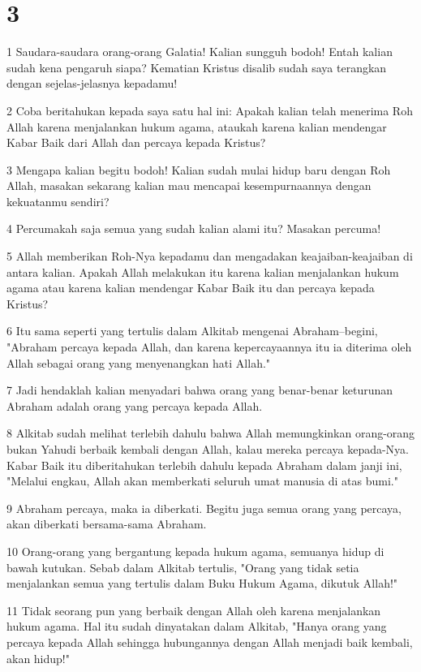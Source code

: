 \chapter{3}

\par 1 Saudara-saudara orang-orang Galatia! Kalian sungguh bodoh! Entah kalian sudah kena pengaruh siapa? Kematian Kristus disalib sudah saya terangkan dengan sejelas-jelasnya kepadamu!
\par 2 Coba beritahukan kepada saya satu hal ini: Apakah kalian telah menerima Roh Allah karena menjalankan hukum agama, ataukah karena kalian mendengar Kabar Baik dari Allah dan percaya kepada Kristus?
\par 3 Mengapa kalian begitu bodoh! Kalian sudah mulai hidup baru dengan Roh Allah, masakan sekarang kalian mau mencapai kesempurnaannya dengan kekuatanmu sendiri?
\par 4 Percumakah saja semua yang sudah kalian alami itu? Masakan percuma!
\par 5 Allah memberikan Roh-Nya kepadamu dan mengadakan keajaiban-keajaiban di antara kalian. Apakah Allah melakukan itu karena kalian menjalankan hukum agama atau karena kalian mendengar Kabar Baik itu dan percaya kepada Kristus?
\par 6 Itu sama seperti yang tertulis dalam Alkitab mengenai Abraham--begini, "Abraham percaya kepada Allah, dan karena kepercayaannya itu ia diterima oleh Allah sebagai orang yang menyenangkan hati Allah."
\par 7 Jadi hendaklah kalian menyadari bahwa orang yang benar-benar keturunan Abraham adalah orang yang percaya kepada Allah.
\par 8 Alkitab sudah melihat terlebih dahulu bahwa Allah memungkinkan orang-orang bukan Yahudi berbaik kembali dengan Allah, kalau mereka percaya kepada-Nya. Kabar Baik itu diberitahukan terlebih dahulu kepada Abraham dalam janji ini, "Melalui engkau, Allah akan memberkati seluruh umat manusia di atas bumi."
\par 9 Abraham percaya, maka ia diberkati. Begitu juga semua orang yang percaya, akan diberkati bersama-sama Abraham.
\par 10 Orang-orang yang bergantung kepada hukum agama, semuanya hidup di bawah kutukan. Sebab dalam Alkitab tertulis, "Orang yang tidak setia menjalankan semua yang tertulis dalam Buku Hukum Agama, dikutuk Allah!"
\par 11 Tidak seorang pun yang berbaik dengan Allah oleh karena menjalankan hukum agama. Hal itu sudah dinyatakan dalam Alkitab, "Hanya orang yang percaya kepada Allah sehingga hubungannya dengan Allah menjadi baik kembali, akan hidup!"

